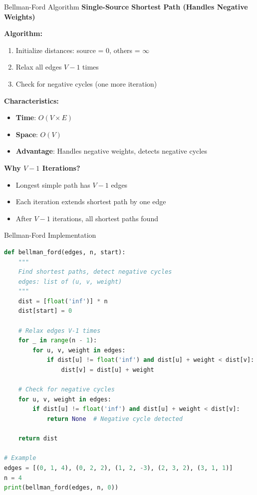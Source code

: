 \documentclass[aspectratio=169]{beamer}
\begin{document}
\begin{frame}{Bellman-Ford Algorithm}
  \textbf{Single-Source Shortest Path (Handles Negative Weights)}

  \vspace{0.3cm}
  \textbf{Algorithm:}
  \begin{enumerate}
    \item Initialize distances: source = 0, others = $\infty$
    \item Relax all edges $V-1$ times
    \item Check for negative cycles (one more iteration)
  \end{enumerate}

  \vspace{0.3cm}
  \textbf{Characteristics:}
  \begin{itemize}
    \item \textbf{Time}: $O(V \times E)$
    \item \textbf{Space}: $O(V)$
    \item \textbf{Advantage}: Handles negative weights, detects negative cycles
  \end{itemize}

  \vspace{0.3cm}
  \textbf{Why $V-1$ Iterations?}
  \begin{itemize}
    \item Longest simple path has $V-1$ edges
    \item Each iteration extends shortest path by one edge
    \item After $V-1$ iterations, all shortest paths found
  \end{itemize}
\end{frame}

\begin{frame}[fragile]{Bellman-Ford Implementation}
\begin{lstlisting}[language=Python, basicstyle=\ttfamily\tiny]
def bellman_ford(edges, n, start):
    """
    Find shortest paths, detect negative cycles
    edges: list of (u, v, weight)
    """
    dist = [float('inf')] * n
    dist[start] = 0

    # Relax edges V-1 times
    for _ in range(n - 1):
        for u, v, weight in edges:
            if dist[u] != float('inf') and dist[u] + weight < dist[v]:
                dist[v] = dist[u] + weight

    # Check for negative cycles
    for u, v, weight in edges:
        if dist[u] != float('inf') and dist[u] + weight < dist[v]:
            return None  # Negative cycle detected

    return dist

# Example
edges = [(0, 1, 4), (0, 2, 2), (1, 2, -3), (2, 3, 2), (3, 1, 1)]
n = 4
print(bellman_ford(edges, n, 0))
\end{lstlisting}
\end{frame}
\end{document}
